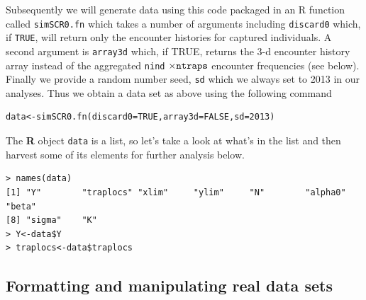 Subsequently we will generate data using this code packaged in an R
function called \mbox{\tt simSCR0.fn} which takes a number of
arguments including \mbox{\tt discard0} which, if \mbox{\tt TRUE}, will return
only the encounter histories for captured individuals.  A second
argument is \mbox{\tt array3d} which, if TRUE, returns the 3-d
encounter history array instead of the aggregated \mbox{\tt nind}
$\times \mbox{\tt ntraps}$ encounter frequencies (see below). Finally
we provide a random number seed, \mbox{\tt sd} which we always set to
2013 in our analyses.  Thus we obtain a data set as above using the
following command
\begin{verbatim}
data<-simSCR0.fn(discard0=TRUE,array3d=FALSE,sd=2013)
\end{verbatim}
The {\bf R} object \mbox{\tt data} is a list, so let's take a look at what's in the list and then harvest some of its elements for further analysis below.
\begin{verbatim}
> names(data)
[1] "Y"        "traplocs" "xlim"     "ylim"     "N"        "alpha0"   "beta"  
[8] "sigma"    "K"       
> Y<-data$Y
> traplocs<-data$traplocs
\end{verbatim}


\subsection{Formatting and manipulating real data sets}
\label{scr0.sec.formats}

